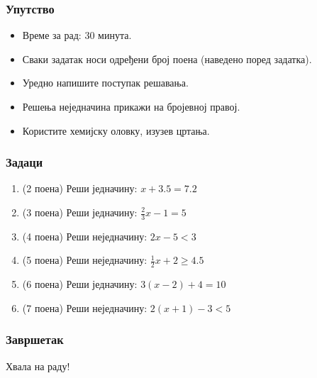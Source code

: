 \documentclass[11pt]{beamer}
\begin{document}
\begin{frame}
    \frametitle{Упут{}ство}
    \begin{itemize}
        \item Време за рад: 30 минута.
        \item Сваки задатак носи одређени број поена (наведено поред задатка).
        \item Уредно напишите поступак решавања.
        \item Решења неједначина прикажи на бројевној правој.
        \item Користите хемијску оловку, изузев цртања.
    \end{itemize}
\end{frame}

\begin{frame}
    \frametitle{Задаци}

    \begin{enumerate}
        \item (2 поена) Реши једначину: $x + 3.5 = 7.2$
        \item (3 поена) Реши једначину: $\frac{2}{3}x - 1 = 5$
        \item (4 поена) Реши неједначину: $2x - 5 < 3$
        \item (5 поена) Реши неједначину: $\frac{1}{2}x + 2 \geq 4.5$
        \item (6 поена) Реши једначину: $3(x - 2) + 4 = 10$
        \item (7 поена) Реши неједначину: $2(x + 1) - 3 < 5$
    \end{enumerate}

\end{frame}

\begin{frame}
    \frametitle{Завршетак}
    Хвала на раду!
\end{frame}
\end{document}
